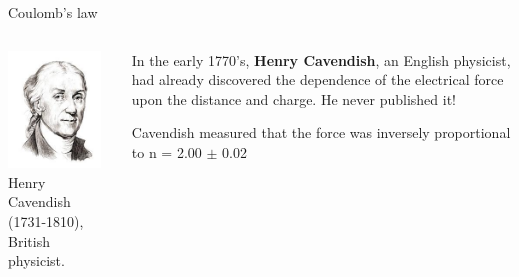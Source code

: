 \begin{frame}{Coulomb's law}

\begin{columns}[t]
  \begin{column}{0.20\textwidth}
   \begin{center}
     \includegraphics[width=0.90\textwidth]{./images/people/cavendish.jpg}\\
     {\scriptsize
      Henry Cavendish (1731-1810), British physicist.\\
     }
   \end{center}
  \end{column}
  \begin{column}{0.80\textwidth}
    \begin{itemize}
    {\small
     \item
     In the early 1770's, {\bf Henry Cavendish}, an English physicist,
     had already discovered the dependence of the electrical force
     upon the distance and charge. He never published it!
     \begin{itemize}
     {\scriptsize
      \item Cavendish measured that the force was inversely
            proportional to {\color{red} n = 2.00 $\pm$ 0.02}
}
\end{itemize}}
\end{itemize}
\end{column}
\end{columns}
\end{frame}
